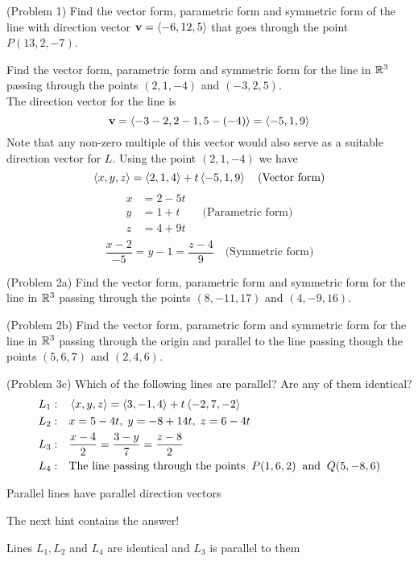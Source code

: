 \documentclass[handout]{ximera}
\begin{document}
\begin{problem}(Problem 1)
Find the vector form, parametric form and symmetric form of the line with direction 
vector $\mathbf{v} = \left\langle -6, 12, 5\right\rangle$ that goes through the point $P(13, 2, -7)$. \\
\end{problem}

\begin{example}[Example 2]
Find the vector form, parametric form and symmetric form for the line in $\mathbb R^3$ passing 
through the points $(2, 1, -4)$ and $(-3, 2, 5)$.\\
The direction vector for the line is 
\[
\mathbf{v} = \left\langle -3-2, 2-1, 5-(-4)\right\rangle = \left\langle -5, 1, 9\right\rangle
\]
Note that any non-zero multiple of this vector would also serve as a suitable direction vector for $L$. 
Using the point $(2, 1, -4)$ we have
\[
\left\langle x, y, z\right\rangle = \left\langle 2, 1, 4\right\rangle + t\left\langle -5, 1, 9\right\rangle \quad \text{(Vector form)}
\]
\begin{align*}
x &= 2 -5t\\
y &= 1 + t \quad\quad\text{(Parametric form)}\\
z &= 4 + 9t\\
\end{align*}
\[
\frac{x-2}{-5} = y-1 = \frac{z-4}{9} \quad \text{(Symmetric form)}
\]
\end{example}

\begin{problem}(Problem 2a)
Find the vector form, parametric form and symmetric form for the line in $\mathbb R^3$ passing 
through the points $(8, -11, 17)$ and $(4, -9, 16)$.\\
\end{problem}

\begin{problem}(Problem 2b)
Find the vector form, parametric form and symmetric form for the line in $\mathbb R^3$ passing through the origin 
and parallel to the line passing though the points $(5, 6, 7)$ and $(2, 4, 6)$.\\
\end{problem}


\begin{problem}(Problem 3c)
Which of the following lines are parallel? Are any of them identical?
\begin{align*}
L_1:&\quad \left\langle x, y, z\right\rangle = \left\langle 3,-1,4\right\rangle + t\left\langle -2,7,-2\right\rangle\\
L_2:& \quad x = 5-4t,\; y = -8+ 14t,\; z = 6-4t\\
L_3:& \quad \frac{x - 4 }{2} = \frac{3 -y}{7}= \frac{z - 8}{2}\\
L_4:&\quad  \text{The line passing through the points} \;\; P(1, 6, 2)\;\; \text{and} \;\; Q(5, -8, 6)
\end{align*}
\begin{hint}
Parallel lines have parallel direction vectors
\end{hint}
\begin{hint}
The next hint contains the answer!
\end{hint}
\begin{hint}
Lines $L_1, L_2$ and $L_4$ are identical and $L_3$ is parallel to them
\end{hint}
\end{problem}
\end{document}
